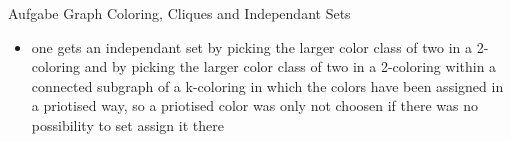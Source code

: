 \begin{frame}[allowframebreaks]{Aufgabe \thesection}{Graph Coloring, Cliques and Independant Sets}
  \begin{solutionnoinc}
  \end{solutionnoinc}
  \begin{solutionnoinc}
    \begin{itemize}
      \item \tiny one gets an independant set by picking the larger color class of two in a 2-coloring and by picking the larger color class of two in a 2-coloring within a connected subgraph of a k-coloring in which the colors have been assigned in a priotised way, so a priotised color was only not choosen if there was no possibility to set assign it there
    \end{itemize}
  \end{solutionnoinc}
\end{frame}
